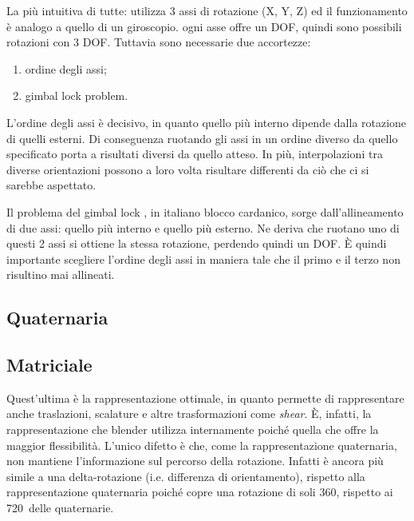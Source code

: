 La più intuitiva di tutte: utilizza 3 assi di rotazione (X, Y, Z) ed il funzionamento è analogo a quello di un giroscopio. ogni asse offre un DOF, quindi sono possibili rotazioni con 3 DOF. Tuttavia sono necessarie due accortezze: 
\begin{enumerate}
    \item ordine degli assi;
    \item gimbal lock problem.
\end{enumerate}
L'ordine degli assi è decisivo, in quanto quello più interno dipende dalla rotazione di quelli esterni. Di conseguenza ruotando gli assi in un ordine diverso da quello specificato porta a risultati diversi da quello atteso. In più, interpolazioni tra diverse orientazioni possono a loro volta risultare differenti da ciò che ci si sarebbe aspettato.

Il problema del gimbal lock \parencite{anticz16}, in italiano blocco cardanico, sorge dall'allineamento di due assi: quello più interno e quello più esterno. Ne deriva che ruotano uno di questi 2 assi si ottiene la stessa rotazione, perdendo quindi un DOF.
È quindi importante scegliere l'ordine degli assi in maniera tale che il primo e il terzo non risultino mai allineati.





\subsection{Quaternaria}

\subsection{Matriciale}
Quest'ultima è la rappresentazione ottimale, in quanto permette di rappresentare anche traslazioni, scalature e altre trasformazioni come \emph{shear}. È, infatti, la rappresentazione che blender utilizza internamente \parencite{blendApi, nat2012rig} poiché quella che offre la maggior flessibilità. L'unico difetto è che, come la rappresentazione quaternaria, non mantiene l'informazione sul percorso della rotazione. Infatti è ancora più simile a una delta-rotazione (i.e. differenza di orientamento), rispetto alla rappresentazione quaternaria poiché copre una rotazione di soli 360\textdegree, rispetto ai 720\textdegree\ delle quaternarie. 


